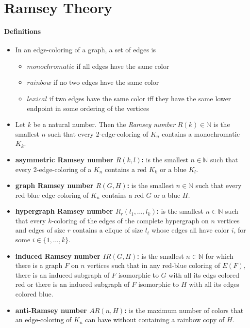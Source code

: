 \section{Ramsey Theory}

\paragraph{Definitions}
\begin{itemize}
    \item In an edge-coloring of a graph, a set of edges is 
        \begin{itemize}
            \item $monochromatic$ if all edges have the same color
            \item $rainbow$ if no two edges have the same color
            \item $lexical$ if two edges have the same color iff
            they have the same lower endpoint in some ordering of 
            the vertices 
        \end{itemize}

    \item Let $k$ be a natural number. Then the \textit{Ramsey number}
    $R(k) \in \mathbb{N}$ is the smallest $n$ such that every 
    2-edge-coloring of $K_n$ contains a monochromatic $K_k$.

    \item \textbf{asymmetric Ramsey number $R(k,l)$:} is the smallest $n\in\mathbb{N}$
    such that every 2-edge-coloring of a $K_n$ contains a red $K_k$
    or a blue $K_l$. 

    \item \textbf{graph Ramsey number $R(G,H)$:} is the smallest $n\in\mathbb{N}$
    such that every red-blue edge-coloring of $K_n$ contains a red $G$
    or a blue $H$.

    \item \textbf{hypergraph Ramsey number $R_r(l_1,...,l_k)$:} is the smallest 
    $n\in\mathbb{N}$ such that every $k$-coloring of the edges of the 
    complete hypergraph on $n$ vertices and edges of size $r$ contains 
    a clique of size $l_i$ whose edges all have color $i$, for some 
    $ i \in \{1,...,k\}$.

    \item \textbf{induced Ramsey number $IR(G,H)$:} is the smallest $n \in \mathbb{N}$
    for which there is a graph $F$ on $n$ vertices such that in any red-blue coloring
    of $E(F)$, there is an induced subgraph of $F$ isomorphic to $G$ with all 
    its edgs colored red or there is an induced subgraph of $F$ isomorphic to 
    $H$ with all its edges colored blue.

    \item \textbf{anti-Ramsey number $AR(n,H)$:} is the maximum number of colors
    that an edge-coloring of $K_n$ can have without containing a rainbow copy 
    of $H$.
\end{itemize}


